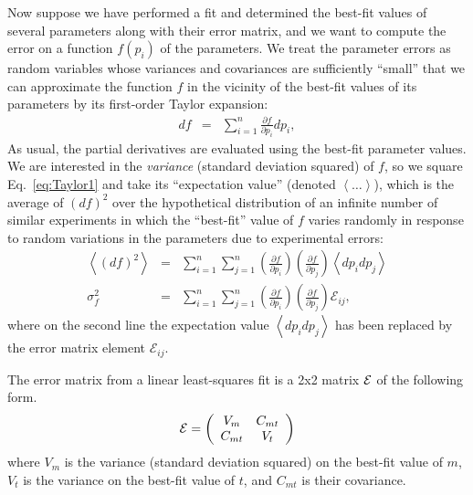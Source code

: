 \documentclass{revtex4}
\begin{document}
Now suppose we have performed a fit and determined the best-fit values of several parameters along with their error matrix, and we want to compute the error on a function $f(p_i)$ of the parameters. We treat the parameter errors as random variables whose variances and covariances are sufficiently ``small'' that we can approximate the function $f$ in the vicinity of the best-fit values of its parameters by its first-order Taylor expansion:
\begin{eqnarray}
  df &=& \sum_{i=1}^{n} \frac{\partial f}{\partial p_i} dp_i \label{eq:Taylor1},
\end{eqnarray}
As usual, the partial derivatives are evaluated using the best-fit parameter values. We are interested in the \emph{variance} (standard deviation squared) of $f$, so we square Eq.~\eqref{eq:Taylor1} and take its ``expectation value'' (denoted $\left<\ldots\right>$), which is the average of $(df)^2$ over the hypothetical distribution of an infinite number of similar experiments in which the ``best-fit'' value of $f$ varies randomly in response to random variations in the parameters due to experimental errors:   
\begin{eqnarray}
  \left<(df)^2\right> &=& \sum_{i=1}^{n}\sum_{j=1}^n \left(\frac{\partial f}{\partial p_i}\right)\left(\frac{\partial f}{\partial p_j}\right)\left<dp_i dp_j\right> \nonumber \\
  \sigma_f^2 &=& \sum_{i=1}^{n}\sum_{j=1}^n \left(\frac{\partial f}{\partial p_i}\right)\left(\frac{\partial f}{\partial p_j}\right) \mathcal{E}_{ij}, \label{errorpropagation}
\end{eqnarray}
where on the second line the expectation value $\left<dp_i dp_j\right>$ has been replaced by the error matrix element $\mathcal{E}_{ij}$. 

The error
matrix from a linear least-squares fit is a 2x2 matrix $\cal{E}$ of the
following form.
\begin{equation}
\cal{E} = \left(\begin{array}{cc}
V_m & C_{mt} \\
C_{mt} & V_t
\end{array}\right)
\end{equation}
where $V_m$ is the variance (standard deviation squared) on the best-fit
value of $m$, $V_t$ is the variance on the best-fit value of $t$, and
$C_{mt}$ is their covariance.
\end{document}
